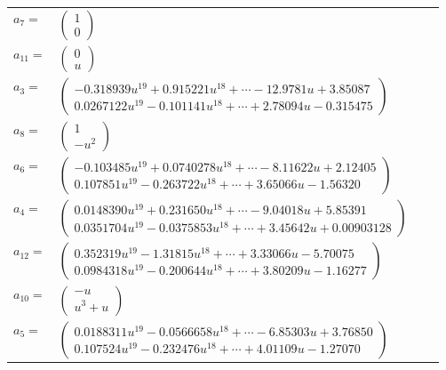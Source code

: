 \documentclass[1p]{elsarticle_modified}
\theoremstyle{definition}
\begin{document}
\begin{tabular}{m{7pt} m{180pt} m{7pt} m{180pt} }
\flushright $a_{7}=$&$\begin{pmatrix}1\\0\end{pmatrix}$ \\
\flushright $a_{11}=$&$\begin{pmatrix}0\\u\end{pmatrix}$ \\
\flushright $a_{3}=$&$\begin{pmatrix}-0.318939 u^{19}+0.915221 u^{18}+\cdots-12.9781 u+3.85087\\0.0267122 u^{19}-0.101141 u^{18}+\cdots+2.78094 u-0.315475\end{pmatrix}$ \\
\flushright $a_{8}=$&$\begin{pmatrix}1\\- u^2\end{pmatrix}$ \\
\flushright $a_{6}=$&$\begin{pmatrix}-0.103485 u^{19}+0.0740278 u^{18}+\cdots-8.11622 u+2.12405\\0.107851 u^{19}-0.263722 u^{18}+\cdots+3.65066 u-1.56320\end{pmatrix}$ \\
\flushright $a_{4}=$&$\begin{pmatrix}0.0148390 u^{19}+0.231650 u^{18}+\cdots-9.04018 u+5.85391\\0.0351704 u^{19}-0.0375853 u^{18}+\cdots+3.45642 u+0.00903128\end{pmatrix}$ \\
\flushright $a_{12}=$&$\begin{pmatrix}0.352319 u^{19}-1.31815 u^{18}+\cdots+3.33066 u-5.70075\\0.0984318 u^{19}-0.200644 u^{18}+\cdots+3.80209 u-1.16277\end{pmatrix}$ \\
\flushright $a_{10}=$&$\begin{pmatrix}- u\\u^3+u\end{pmatrix}$ \\
\flushright $a_{5}=$&$\begin{pmatrix}0.0188311 u^{19}-0.0566658 u^{18}+\cdots-6.85303 u+3.76850\\0.107524 u^{19}-0.232476 u^{18}+\cdots+4.01109 u-1.27070\end{pmatrix}$ \\

\end{tabular}
\end{document}
